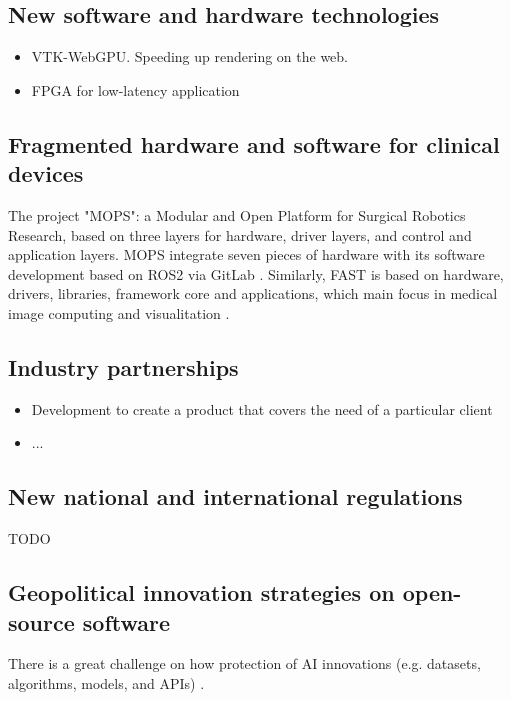 \documentclass{article}
\begin{document}
\subsection{New software and hardware technologies}
\begin{itemize}
\item VTK-WebGPU. Speeding up rendering on the web.
\item FPGA for low-latency application
\end{itemize}

\subsection{Fragmented hardware and software for clinical devices}
The project "MOPS": a Modular and Open Platform for Surgical Robotics Research, based on three layers for hardware, driver layers, and control and application layers. MOPS integrate seven pieces of hardware with its software development based on ROS2 via GitLab \cite{Schwaner2021-MOPS, mops-repo}. 
Similarly, FAST is based on hardware, drivers, libraries, framework core and applications, which main focus in medical image computing and visualitation \cite{Smistad2015-FAST, fast-repo}.


\subsection{Industry partnerships}
\begin{itemize}
    \item Development to create a product that covers the need of a particular client
    \item ...
\end{itemize}


\subsection{New national and international regulations}
TODO

\subsection{Geopolitical innovation strategies on open-source software}
There is a great challenge on how protection of AI innovations (e.g. datasets, algorithms, models, and APIs) \cite{munozferrandis2022-open-sourcing-ai}.
\end{document}

